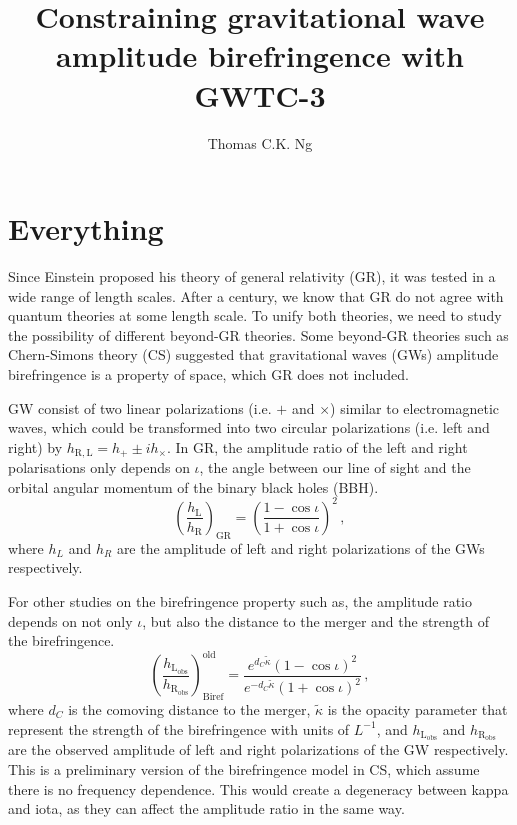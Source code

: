 \documentclass[twocolumn]{aastex631}
\begin{document}
\title{Constraining gravitational wave amplitude birefringence with GWTC-3}

\author{Thomas C.K. Ng}

\begin{abstract}
    
\end{abstract}

\section{Everything}
Since Einstein proposed his theory of general relativity (GR), it was tested in a wide range of length scales.
After a century, we know that GR do not agree with quantum theories at some length scale.
To unify both theories, we need to study the possibility of different beyond-GR theories.
Some beyond-GR theories such as Chern-Simons theory (CS) suggested that gravitational waves (GWs) amplitude birefringence is a property of space, which GR does not included.

GW consist of two linear polarizations (i.e. $+$ and $\times$) similar to electromagnetic waves, which could be transformed into two circular polarizations (i.e. left and right) by $h_{\mathrm{R}, \mathrm{L}} = h_+ \pm i h_\times$.
In GR, the amplitude ratio of the left and right polarisations only depends on $\iota$, the angle between our line of sight and the orbital angular momentum of the binary black holes (BBH).
\begin{equation}
    \left(\frac{h_\mathrm{L}}{h_\mathrm{R}}\right)_\mathrm{GR}=\left(\frac{1-\cos\iota}{1+\cos\iota}\right)^2\,,
\end{equation}where $h_L$ and $h_R$ are the amplitude of left and right polarizations of the GWs respectively.

For other studies on the birefringence property such as\citet{Maria_2021}, the amplitude ratio depends on not only $\iota$, but also the distance to the merger and the strength of the birefringence.
\begin{equation}
    \left(\frac{h_\mathrm{L_{obs}}}{h_\mathrm{R_{obs}}}\right)_\mathrm{Biref}^\mathrm{old}=\frac{e^{d_C\widetilde{\kappa}}\left(1-\cos\iota\right)^2}{e^{-d_C\widetilde{\kappa}}\left(1+\cos\iota\right)^2}\,,
\end{equation}where $d_C$ is the comoving distance to the merger, $\widetilde{\kappa}$ is the opacity parameter that represent the strength of the birefringence with units of $L^{-1}$, and $h_\mathrm{L_{obs}}$ and $h_\mathrm{R_{obs}}$ are the observed amplitude of left and right polarizations of the GW respectively.
This is a preliminary version of the birefringence model in CS, which assume there is no frequency dependence.
This would create a degeneracy between kappa and iota, as they can affect the amplitude ratio in the same way.
\end{document}
